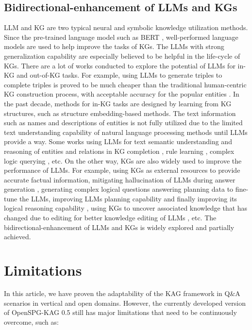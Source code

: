 \documentclass{article}
\begin{document}
\subsection{Bidirectional-enhancement of LLMs and KGs}
LLM and KG are two typical neural and symbolic knowledge utilization methods. Since the pre-trained language model such as BERT \cite{DBLP:conf/naacl/DevlinCLT19}, well-performed language models are used to help improve the tasks of KGs. The LLMs with strong generalization capability are especially believed to be helpful in the life-cycle of KGs. There are a lot of works conducted to explore the potential of LLMs for in-KG and out-of-KG tasks. For example, using LLMs to generate triples to complete triples is proved to be much cheaper than the traditional human-centric KG construction process, with acceptable accuracy for the popular entities \cite{DBLP:conf/emnlp/VeseliRKW23}.
In the past decade, methods for in-KG tasks are designed by learning from KG structures, such as structure embedding-based methods. The text information such as names and descriptions of entities is not fully utilized due to the limited text understanding capability of natural language processing methods until LLMs provide a way. Some works using LLMs for text semantic understanding and reasoning of entities and relations in KG completion 
 \cite{KoPA}, rule learning \cite{chatrule}, complex logic querying \cite{DBLP:journals/corr/abs-2305-01157}, etc. On the other way, KGs are also widely used to improve the performance of LLMs. For example, using KGs as external resources to provide accurate factual information, mitigating hallucination of LLMs during answer generation \cite{ma2024think}, generating complex logical questions answering planning data to fine-tune the LLMs, improving LLMs planning capability and finally improving its logical reasoning capability \cite{DBLP:journals/corr/abs-2406-14282}, using KGs to uncover associated knowledge that has changed due to editing for better knowledge editing of LLMs \cite{DBLP:journals/corr/abs-2402-13593}, etc. The bidirectional-enhancement of LLMs and KGs is widely explored and partially achieved. 

\section{Limitations}
In this article, we have proven the adaptability of the KAG framework in Q\&A scenarios in vertical and open domains. However, the currently developed version of OpenSPG-KAG 0.5 still has major limitations that need to be continuously overcome, such as:
\end{document}
